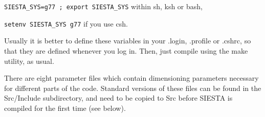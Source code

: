 \vspace{2pt}
{\tt SIESTA\_SYS=g77 ; export SIESTA\_SYS} \hspace{1cm} within sh, ksh or bash,

\vspace{1pt}
{\tt setenv SIESTA\_SYS g77} \hspace{2.5cm} if you use csh.

\vspace{2pt}
\noindent
Usually it is better to define these variables in your
.login, .profile or .cshrc, so that they are defined
whenever you log in.
Then, just compile using the make utility, as usual.


There are eight parameter files which contain
dimensioning parameters necessary 
for different parts of the code. Standard versions
of these files can be found in the Src/Include subdirectory, and
need to be copied to Src before SIESTA is compiled for the first time
(see below).


